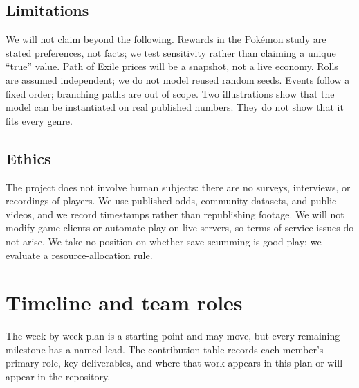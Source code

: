 \documentclass[11pt,a4paper]{article}
\begin{document}
\subsection{Limitations}
We will not claim beyond the following. Rewards in the Pok\'emon study are stated preferences, not facts; we test sensitivity rather than claiming a unique ``true'' value. Path of Exile prices will be a snapshot, not a live economy. Rolls are assumed independent; we do not model reused random seeds. Events follow a fixed order; branching paths are out of scope. Two illustrations show that the model can be instantiated on real published numbers. They do not show that it fits every genre.

\subsection{Ethics}
The project does not involve human subjects: there are no surveys, interviews, or recordings of players. We use published odds, community datasets, and public videos, and we record timestamps rather than republishing footage. We will not modify game clients or automate play on live servers, so terms-of-service issues do not arise. We take no position on whether save-scumming is good play; we evaluate a resource-allocation rule.

\section{Timeline and team roles}
\label{sec:timeline}
The week-by-week plan is a starting point and may move, but every remaining milestone has a named lead. The contribution table records each member's primary role, key deliverables, and where that work appears in this plan or will appear in the repository.
\end{document}
